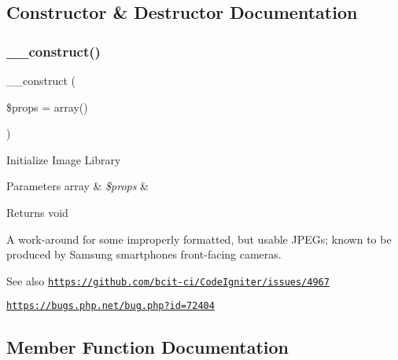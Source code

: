 \subsection{Constructor \& Destructor Documentation}
\mbox{\label{class_c_i___image__lib_a563262d396a1cef6153c9998d77bb548}} 
\subsubsection{\texorpdfstring{\+\_\+\+\_\+construct()}{\_\_construct()}}
{\footnotesize\ttfamily \+\_\+\+\_\+construct (\begin{DoxyParamCaption}\item[{}]{\$props = {\ttfamily array()} }\end{DoxyParamCaption})}

Initialize Image Library


\begin{DoxyParams}[1]{Parameters}
array & {\em \$props} & \\
\hline
\end{DoxyParams}
\begin{DoxyReturn}{Returns}
void 
\end{DoxyReturn}
A work-\/around for some improperly formatted, but usable J\+P\+E\+Gs; known to be produced by Samsung smartphones\textquotesingle{} front-\/facing cameras.

\begin{DoxySeeAlso}{See also}
\href{https://github.com/bcit-ci/CodeIgniter/issues/4967}{\tt https\+://github.\+com/bcit-\/ci/\+Code\+Igniter/issues/4967} 

\href{https://bugs.php.net/bug.php?id=72404}{\tt https\+://bugs.\+php.\+net/bug.\+php?id=72404}
\end{DoxySeeAlso}


\subsection{Member Function Documentation}
\mbox{\label{class_c_i___image__lib_aa821bec12eaa7e0f649397c9675ff505}} 
